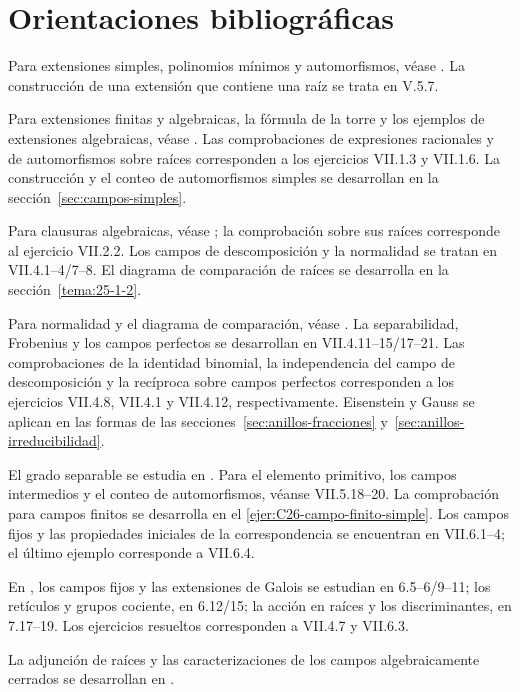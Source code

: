 \section*{Orientaciones bibliográficas}
Para extensiones simples, polinomios mínimos y automorfismos, véase \citet[cap.~VII, apartados 1.1--2, definiciones 1.1--2, proposiciones 1.3/5, ejemplo 1.4 y corolario 1.7]{aluffi2009}. La construcción de una extensión que contiene una raíz se trata en V.5.7.

Para extensiones finitas y algebraicas, la fórmula de la torre y los ejemplos de extensiones algebraicas, véase \citet[cap.~VII, apartado 1.3, definición 1.8, lema 1.9 y resultados 1.10--19]{aluffi2009}. Las comprobaciones de expresiones racionales y de automorfismos sobre raíces corresponden a los ejercicios VII.1.3 y VII.1.6. La construcción y el conteo de automorfismos simples se desarrollan en la sección~\ref{sec:campos-simples}.

Para clausuras algebraicas, véase \citet[cap.~VII, apartado 2.1, lema 2.1, definición 2.2, teorema 2.3 y resultados 2.4--6/8]{aluffi2009}; la comprobación sobre sus raíces corresponde al ejercicio VII.2.2. Los campos de descomposición y la normalidad se tratan en VII.4.1--4/7--8. El diagrama de comparación de raíces se desarrolla en la sección~\ref{tema:25-1-2}.

Para normalidad y el diagrama de comparación, véase \citet[cap.~VII, definición 4.7 y teorema 4.8]{aluffi2009}. La separabilidad, Frobenius y los campos perfectos se desarrollan en VII.4.11--15/17--21. Las comprobaciones de la identidad binomial, la independencia del campo de descomposición y la recíproca sobre campos perfectos corresponden a los ejercicios VII.4.8, VII.4.1 y VII.4.12, respectivamente. Eisenstein y Gauss se aplican en las formas de las secciones~\ref{sec:anillos-fracciones} y~\ref{sec:anillos-irreducibilidad}.

El grado separable se estudia en \citet[cap.~VII, lemas 4.22--23 y proposición 4.24]{aluffi2009}. Para el elemento primitivo, los campos intermedios y el conteo de automorfismos, véanse VII.5.18--20. La comprobación para campos finitos se desarrolla en el \cref{ejer:C26-campo-finito-simple}. Los campos fijos y las propiedades iniciales de la correspondencia se encuentran en VII.6.1--4; el último ejemplo corresponde a VII.6.4.

En \citet[cap.~VII]{aluffi2009}, los campos fijos y las extensiones de Galois se estudian en 6.5--6/9--11; los retículos y grupos cociente, en 6.12/15; la acción en raíces y los discriminantes, en 7.17--19. Los ejercicios resueltos corresponden a VII.4.7 y VII.6.3.

La adjunción de raíces y las caracterizaciones de los campos algebraicamente cerrados se desarrollan en \citet[cap.~V, apartados 5.1--4 y resultados 5.7--10]{aluffi2009}.
